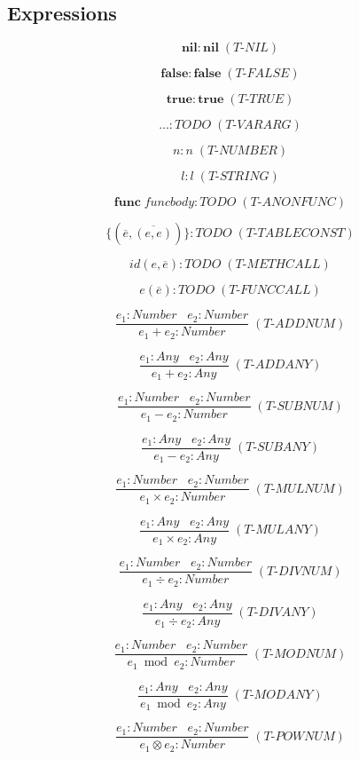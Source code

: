 \documentclass[12pt]{article}
\begin{document}
\subsection{Expressions}

\[
\textbf{nil} : \textbf{nil} \; (\textit{T-NIL})
\]

\[
\textbf{false} : \textbf{false} \; (\textit{T-FALSE})
\]

\[
\textbf{true} : \textbf{true} \; (\textit{T-TRUE})
\]

\[
{...} : TODO \; (\textit{T-VARARG})
\]

\[
n : n \; (\textit{T-NUMBER})
\]

\[
l : l \; (\textit{T-STRING})
\]

\[
\textbf{func} \; funcbody : TODO \; (\textit{T-ANONFUNC})
\]

\[
\{(\overline{e},\overline{(e,e)})\} : TODO \; (\textit{T-TABLECONST})
\]

\[
id(e,\overline{e}) : TODO \; (\textit{T-METHCALL})
\]

\[
e(\overline{e}) : TODO \; (\textit{T-FUNCCALL})
\]

\[
\frac{e_{1}:Number \;\;\; e_{2}:Number}
     {e_{1} + e_{2} : Number} \; (\textit{T-ADDNUM})
\]

\[
\frac{e_{1}:Any \;\;\; e_{2}:Any}
     {e_{1} + e_{2} : Any} \; (\textit{T-ADDANY})
\]

\[
\frac{e_{1}:Number \;\;\; e_{2}:Number}
     {e_{1} - e_{2} : Number} \; (\textit{T-SUBNUM})
\]

\[
\frac{e_{1}:Any \;\;\; e_{2}:Any}
     {e_{1} - e_{2} : Any} \; (\textit{T-SUBANY})
\]

\[
\frac{e_{1}:Number \;\;\; e_{2}:Number}
     {e_{1} \times e_{2} : Number} \; (\textit{T-MULNUM})
\]

\[
\frac{e_{1}:Any \;\;\; e_{2}:Any}
     {e_{1} \times e_{2} : Any} \; (\textit{T-MULANY})
\]

\[
\frac{e_{1}:Number \;\;\; e_{2}:Number}
     {e_{1} \div e_{2} : Number} \; (\textit{T-DIVNUM})
\]

\[
\frac{e_{1}:Any \;\;\; e_{2}:Any}
     {e_{1} \div e_{2} : Any} \; (\textit{T-DIVANY})
\]

\[
\frac{e_{1}:Number \;\;\; e_{2}:Number}
     {e_{1} \bmod e_{2} : Number} \; (\textit{T-MODNUM})
\]

\[
\frac{e_{1}:Any \;\;\; e_{2}:Any}
     {e_{1} \bmod e_{2} : Any} \; (\textit{T-MODANY})
\]

\[
\frac{e_{1}:Number \;\;\; e_{2}:Number}
     {e_{1} \otimes e_{2} : Number} \; (\textit{T-POWNUM})
\]
\end{document}
